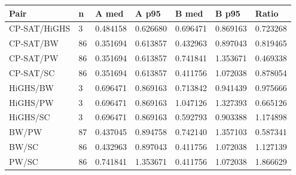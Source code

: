 \begin{tabular}{lllllll}
\hline
Pair & n & A med & A p95 & B med & B p95 & Ratio \\
\hline
CP-SAT/HiGHS & 3 & 0.484158 & 0.626680 & 0.696471 & 0.869163 & 0.723268 \\
CP-SAT/BW & 86 & 0.351694 & 0.613857 & 0.432963 & 0.897043 & 0.819465 \\
CP-SAT/PW & 86 & 0.351694 & 0.613857 & 0.741841 & 1.353671 & 0.469338 \\
CP-SAT/SC & 86 & 0.351694 & 0.613857 & 0.411756 & 1.072038 & 0.878054 \\
HiGHS/BW & 3 & 0.696471 & 0.869163 & 0.713842 & 0.941439 & 0.975666 \\
HiGHS/PW & 3 & 0.696471 & 0.869163 & 1.047126 & 1.327393 & 0.665126 \\
HiGHS/SC & 3 & 0.696471 & 0.869163 & 0.592793 & 0.903388 & 1.174898 \\
BW/PW & 87 & 0.437045 & 0.894758 & 0.742140 & 1.357103 & 0.587341 \\
BW/SC & 86 & 0.432963 & 0.897043 & 0.411756 & 1.072038 & 1.127139 \\
PW/SC & 86 & 0.741841 & 1.353671 & 0.411756 & 1.072038 & 1.866629 \\
\hline
\end{tabular}
